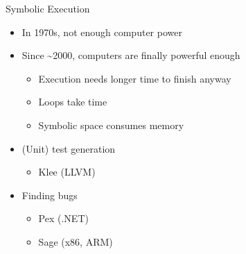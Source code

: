 \begin{frame}{Symbolic Execution}

  \begin{itemize}
    \item In 1970s, not enough computer power

    \pause

    \item Since \textasciitilde 2000, computers are finally powerful enough
    \begin{itemize}
      \item Execution needs longer time to finish anyway
      \item Loops take time
      \item Symbolic space consumes memory
    \end{itemize}

    \pause

    \item (Unit) test generation
    \begin{itemize}
      \item Klee (LLVM)
    \end{itemize}

    \pause

    \item Finding bugs
    \begin{itemize}
      \item Pex (.NET)
      \item Sage (x86, ARM)
    \end{itemize}
  \end{itemize}

\end{frame}

